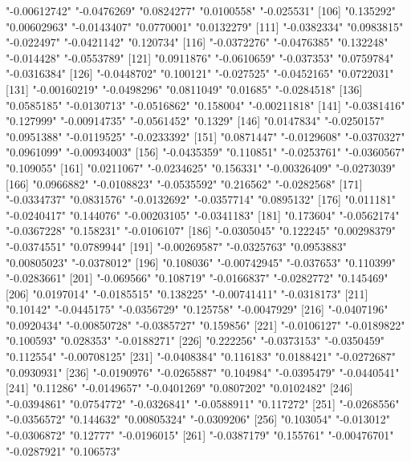 \begin{Schunk}
\begin{Soutput}
[101] "-0.00612742"  "-0.0476269"   "0.0824277"    "0.0100558"    "-0.025531"   
[106] "0.135292"     "0.00602963"   "-0.0143407"   "0.0770001"    "0.0132279"   
[111] "-0.0382334"   "0.0983815"    "-0.022497"    "-0.0421142"   "0.120734"    
[116] "-0.0372276"   "-0.0476385"   "0.132248"     "-0.014428"    "-0.0553789"  
[121] "0.0911876"    "-0.0610659"   "-0.037353"    "0.0759784"    "-0.0316384"  
[126] "-0.0448702"   "0.100121"     "-0.027525"    "-0.0452165"   "0.0722031"   
[131] "-0.00160219"  "-0.0498296"   "0.0811049"    "0.01685"      "-0.0284518"  
[136] "0.0585185"    "-0.0130713"   "-0.0516862"   "0.158004"     "-0.00211818" 
[141] "-0.0381416"   "0.127999"     "-0.00914735"  "-0.0561452"   "0.1329"      
[146] "0.0147834"    "-0.0250157"   "0.0951388"    "-0.0119525"   "-0.0233392"  
[151] "0.0871447"    "-0.0129608"   "-0.0370327"   "0.0961099"    "-0.00934003" 
[156] "-0.0435359"   "0.110851"     "-0.0253761"   "-0.0360567"   "0.109055"    
[161] "0.0211067"    "-0.0234625"   "0.156331"     "-0.00326409"  "-0.0273039"  
[166] "0.0966882"    "-0.0108823"   "-0.0535592"   "0.216562"     "-0.0282568"  
[171] "-0.0334737"   "0.0831576"    "-0.0132692"   "-0.0357714"   "0.0895132"   
[176] "0.011181"     "-0.0240417"   "0.144076"     "-0.00203105"  "-0.0341183"  
[181] "0.173604"     "-0.0562174"   "-0.0367228"   "0.158231"     "-0.0106107"  
[186] "-0.0305045"   "0.122245"     "0.00298379"   "-0.0374551"   "0.0789944"   
[191] "-0.00269587"  "-0.0325763"   "0.0953883"    "0.00805023"   "-0.0378012"  
[196] "0.108036"     "-0.00742945"  "-0.037653"    "0.110399"     "-0.0283661"  
[201] "-0.069566"    "0.108719"     "-0.0166837"   "-0.0282772"   "0.145469"    
[206] "0.0197014"    "-0.0185515"   "0.138225"     "-0.00741411"  "-0.0318173"  
[211] "0.10142"      "-0.0445175"   "-0.0356729"   "0.125758"     "-0.0047929"  
[216] "-0.0407196"   "0.0920434"    "-0.00850728"  "-0.0385727"   "0.159856"    
[221] "-0.0106127"   "-0.0189822"   "0.100593"     "0.028353"     "-0.0188271"  
[226] "0.222256"     "-0.0373153"   "-0.0350459"   "0.112554"     "-0.00708125" 
[231] "-0.0408384"   "0.116183"     "0.0188421"    "-0.0272687"   "0.0930931"   
[236] "-0.0190976"   "-0.0265887"   "0.104984"     "-0.0395479"   "-0.0440541"  
[241] "0.11286"      "-0.0149657"   "-0.0401269"   "0.0807202"    "0.0102482"   
[246] "-0.0394861"   "0.0754772"    "-0.0326841"   "-0.0588911"   "0.117272"    
[251] "-0.0268556"   "-0.0356572"   "0.144632"     "0.00805324"   "-0.0309206"  
[256] "0.103054"     "-0.013012"    "-0.0306872"   "0.12777"      "-0.0196015"  
[261] "-0.0387179"   "0.155761"     "-0.00476701"  "-0.0287921"   "0.106573"    

\end{Soutput}
\end{Schunk}
